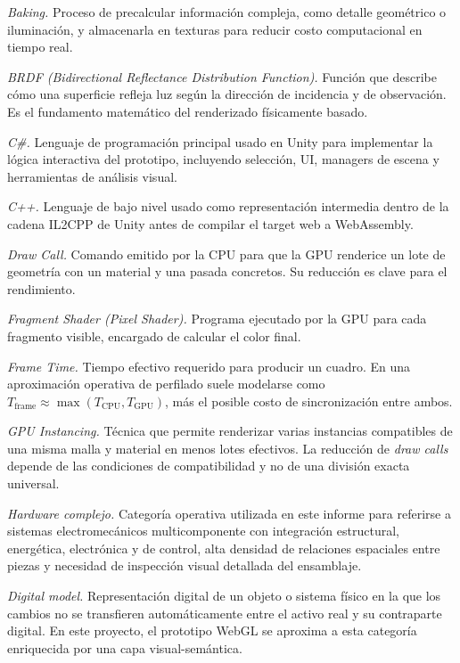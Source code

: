 \textit{Baking.} Proceso de precalcular información compleja, como detalle geométrico o iluminación, y almacenarla en texturas para reducir costo computacional en tiempo real.

\textit{BRDF (\textit{Bidirectional Reflectance Distribution Function}).} Función que describe cómo una superficie refleja luz según la dirección de incidencia y de observación. Es el fundamento matemático del renderizado físicamente basado.

\textit{C\#.} Lenguaje de programación principal usado en Unity para implementar la lógica interactiva del prototipo, incluyendo selección, UI, managers de escena y herramientas de análisis visual.

\textit{C++.} Lenguaje de bajo nivel usado como representación intermedia dentro de la cadena IL2CPP de Unity antes de compilar el target web a WebAssembly.

\textit{Draw Call.} Comando emitido por la CPU para que la GPU renderice un lote de geometría con un material y una pasada concretos. Su reducción es clave para el rendimiento.

\textit{Fragment Shader (\textit{Pixel Shader}).} Programa ejecutado por la GPU para cada fragmento visible, encargado de calcular el color final.

\textit{Frame Time.} Tiempo efectivo requerido para producir un cuadro. En una aproximación operativa de perfilado suele modelarse como $T_{\text{frame}} \approx \max(T_{\text{CPU}}, T_{\text{GPU}})$, más el posible costo de sincronización entre ambos.

\textit{GPU Instancing.} Técnica que permite renderizar varias instancias compatibles de una misma malla y material en menos lotes efectivos. La reducción de \textit{draw calls} depende de las condiciones de compatibilidad y no de una división exacta universal.

\textit{Hardware complejo.} Categoría operativa utilizada en este informe para referirse a sistemas electromecánicos multicomponente con integración estructural, energética, electrónica y de control, alta densidad de relaciones espaciales entre piezas y necesidad de inspección visual detallada del ensamblaje.

\textit{Digital model.} Representación digital de un objeto o sistema físico en la que los cambios no se transfieren automáticamente entre el activo real y su contraparte digital. En este proyecto, el prototipo WebGL se aproxima a esta categoría enriquecida por una capa visual-semántica.

